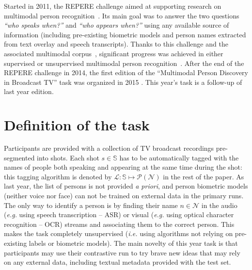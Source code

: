 \documentclass{acm_proc_article-me}
\newcommand\shots{\mathbb{S}}
\newcommand\hypLabels{\mathcal{L}}
\newcommand\hypNames{\mathcal{N}}
\begin{document}
Started in 2011, the REPERE challenge aimed at supporting research on multimodal person recognition~\cite{BERNARD--SLAM--2013, KAHN--CBMI--2012}. Its main goal was to answer the two questions \emph{``who speaks when?''} and \emph{``who appears when?''} using any available source of information (including pre-existing biometric models and person names extracted from text overlay and speech transcripts). Thanks to this challenge and the associated multimodal corpus~\cite{GIRAUDEL--LREC--2012}, significant progress was achieved in either supervised or unsupervised multimodal person recognition~\cite{BECHET--INTERSPEECH--2014, BENDRIS--CBMI--2013, BREDIN--ODYSSEY--2014, BREDIN--INTERSPEECH--2013, BREDIN--SLAM--2013, BREDIN--IJMIR--2014, FAVRE--SLAM--2013, GAY--CBMI--2014, POIGNANT--ASLP--2015, POIGNANT--SLAM--2013, POIGNANT--INTERSPEECH--2012, POIGNANT--MTAP--2015, ROUVIER--CBMI--2014}.
After the end of the REPERE challenge in 2014, the  first edition of the ``Multimodal Person Discovery in Broadcast TV'' task was organized in 2015 \cite{POIGNANT--MEDIAEVAL--2015}. This year's task is a follow-up of last year edition.

\vspace{-0.1cm}
\section{Definition of the task}

Participants are provided with a collection of TV broadcast recordings pre-segmented into shots.
Each shot $s \in \shots$ has to be automatically tagged with the names of people both speaking and appearing at the same time during the shot: this tagging algorithm is denoted by $\hypLabels : \shots \mapsto \mathcal{P}(\hypNames)$ in the rest of the paper.
As last year, the list of persons is not provided \emph{a priori}, and person biometric models (neither voice nor face) can not be trained on external data in the primary runs. The only way to identify a person is by finding their name $n \in \hypNames$ in the audio (\emph{e.g.} using speech transcription -- ASR) or visual (\emph{e.g.} using optical character recognition -- OCR) streams and associating them to the correct person. This makes the task completely unsupervised (\emph{i.e.} using algorithms not relying on pre-existing labels or biometric models). The main novelty of this year task is that participants may use their contrastive run to try brave new ideas that may rely on any external data, including textual metadata provided with the test set.
\end{document}
